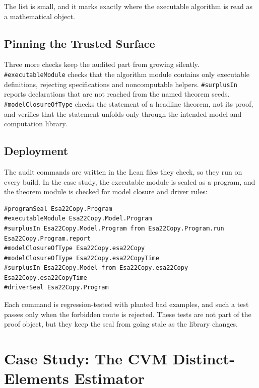 \documentclass[acmsmall,nonacm]{acmart}
\begin{document}
The list is small, and it marks exactly where the executable algorithm is read as a mathematical object.

\subsection{Pinning the Trusted Surface}\label{sec:executable-surplus}

Three more checks keep the audited part from growing silently.
\lstinline{#executableModule} checks that the algorithm module contains only executable definitions, rejecting specifications and noncomputable helpers.
\lstinline{#surplusIn} reports declarations that are not reached from the named theorem seeds.
\lstinline{#modelClosureOfType}\label{sec:model-closure} checks the statement of a headline theorem, not its proof, and verifies that the statement unfolds only through the intended model and computation library.

\subsection{Deployment}\label{sec:build-commands}

The audit commands are written in the Lean files they check, so they run on every build.
In the case study, the executable module is sealed as a program, and the theorem module is checked for model closure and driver rules:

\begin{lstlisting}
#programSeal Esa22Copy.Program
#executableModule Esa22Copy.Model.Program
#surplusIn Esa22Copy.Model.Program from Esa22Copy.Program.run Esa22Copy.Program.report
#modelClosureOfType Esa22Copy.esa22Copy
#modelClosureOfType Esa22Copy.esa22CopyTime
#surplusIn Esa22Copy.Model from Esa22Copy.esa22Copy Esa22Copy.esa22CopyTime
#driverSeal Esa22Copy.Program
\end{lstlisting}

Each command is regression-tested with planted bad examples, and such a test passes only when the forbidden route is rejected.
These tests are not part of the proof object, but they keep the seal from going stale as the library changes.

\section{Case Study: The CVM Distinct-Elements Estimator}\label{sec:case-study}
\end{document}
